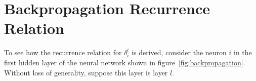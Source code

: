 \documentclass[a4paper, 12pt]{report}
\begin{document}



\appendix

\chapter{Backpropagation Recurrence Relation} \label{appendix:bp_recurrence}

To see how the recurrence relation for $\delta_i^l$ is derived, consider the neuron $i$ in the first hidden layer of the neural network shown in figure~\ref{fig:backpropagation}. Without loss of generality, suppose this layer is layer $l$. \\
\end{document}
